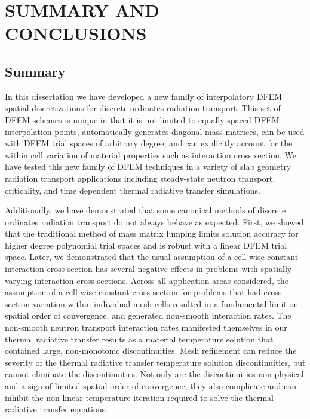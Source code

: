 %
%
%



\chapter{\uppercase{Summary and Conclusions}}
\label{sec:chapter7_conclusions}

\section{Summary}

In this dissertation we have developed a new family of interpolatory DFEM spatial discretizations for discrete ordinates radiation transport.
This set of DFEM schemes is unique in that it is not limited to equally-spaced DFEM interpolation points, automatically generates diagonal mass matrices, can be used with DFEM trial spaces of arbitrary degree, and can explicitly account for the within cell variation of material properties such as interaction cross section.
We have tested this new family of DFEM techniques in a variety of slab geometry radiation transport applications including steady-state neutron transport, criticality, and time dependent thermal radiative transfer simulations.

Additionally, we have demonstrated that some canonical methods of discrete ordinates radiation transport do not always behave as expected.
First, we showed that the traditional method of mass matrix lumping limits solution accuracy for higher degree polynomial trial spaces and is robust with a linear DFEM trial space.
Later, we demonstrated that the usual assumption of a cell-wise constant interaction cross section has several negative effects in problems with spatially varying interaction cross sections.
Across all application areas considered, the assumption of a cell-wise constant cross section for problems that had cross section variation within individual mesh cells resulted in a fundamental limit on spatial order of convergence, and generated non-smooth interaction rates.
The non-smooth neutron transport interaction rates manifested themselves in our thermal radiative transfer results as a material temperature solution that contained large, non-monotonic discontinuities.
Mesh refinement can reduce the severity of the thermal radiative transfer temperature solution discontinuities, but cannot eliminate the discontinuities.
Not only are the discontinuities non-physical and a sign of limited spatial order of convergence, they also complicate and can inhibit the non-linear temperature iteration required to solve the thermal radiative transfer equations. 


